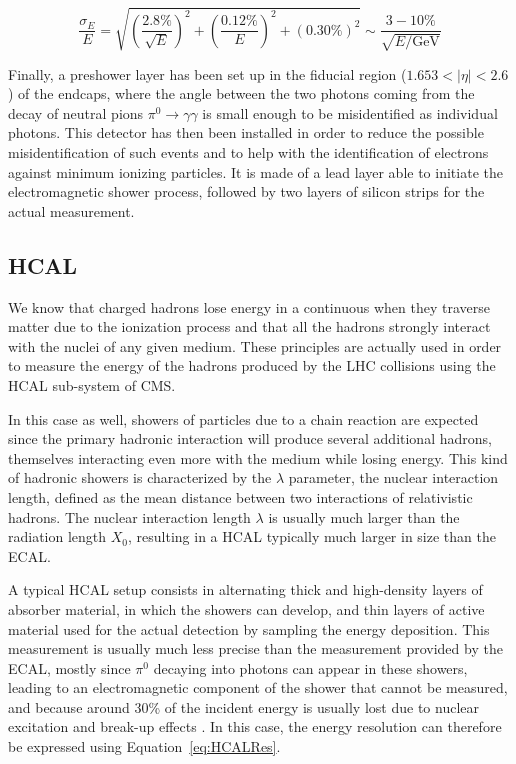 \documentclass[a4paper, 10pt, openright]{report}
\begin{document}
\begin{equation}
\label{eq:CMSEcal}
\frac{\sigma_E}{E} = \sqrt{\left ( \frac{2.8 \%}{\sqrt{E}} \right)^2 + \left ( \frac{0.12 \%}{E} \right )^2 + (0.30 \%)^2} \sim \frac{3-10\%}{\sqrt{E/\text{GeV}}}
\end{equation}

Finally, a preshower layer has been set up in the fiducial region ($1.653 < |\eta| < 2.6$) of the endcaps, where the angle between the two photons coming from the decay of neutral pions $\pi^0 \rightarrow \gamma \gamma$ is small enough to be misidentified as individual photons. This detector has then been installed in order to reduce the possible misidentification of such events and to help with the identification of electrons against minimum ionizing particles. It is made of a lead layer able to initiate the electromagnetic shower process, followed by two layers of silicon strips for the actual measurement.

\subsection{\acf{HCAL}}\label{subsection:HCAL}

We know that charged hadrons lose energy in a continuous when they traverse matter due to the ionization process and that all the hadrons strongly interact with the nuclei of any given medium. These principles are actually used in order to measure the energy of the hadrons produced by the \ac{LHC} collisions using the \ac{HCAL} sub-system of \ac{CMS}. 

In this case as well, showers of particles due to a chain reaction are expected since the primary hadronic interaction will produce several additional hadrons, themselves interacting even more with the medium while losing energy. This kind of hadronic showers is characterized by the $\lambda$ parameter, the nuclear interaction length, defined as the mean distance between two interactions of relativistic hadrons. The nuclear interaction length $\lambda$ is usually much larger than the radiation length $X_0$, resulting in a \ac{HCAL} typically much larger in size than the \ac{ECAL}. 

A typical \ac{HCAL} setup consists in alternating thick and high-density layers of absorber material, in which the showers can develop, and thin layers of active material used for the actual detection by sampling the energy deposition. This measurement is usually much less precise than the measurement provided by the \ac{ECAL}, mostly since $\pi^0$ decaying into photons can appear in these showers, leading to an electromagnetic component of the shower that cannot be measured, and because around 30\% of the incident energy is usually lost due to nuclear excitation and break-up effects \cite{Thomson}. In this case, the energy resolution can therefore be expressed using Equation~\ref{eq:HCALRes}.
\end{document}
